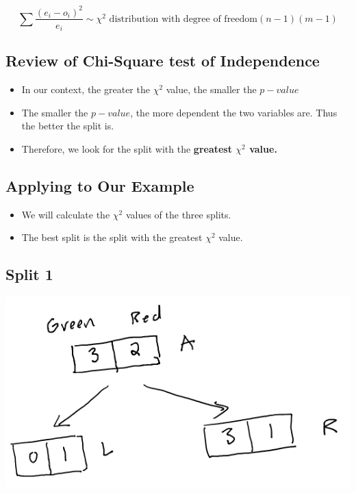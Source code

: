 \documentclass[
]{article}
\providecommand{\tightlist}{%
  \setlength{\itemsep}{0pt}\setlength{\parskip}{0pt}}
\begin{document}
\[\sum\frac{(e_i-o_i)^2}{e_i} \sim \chi^2 \text{ distribution with degree of freedom} (n-1)(m-1)\]

\hypertarget{review-of-chi-square-test-of-independence-1}{%
\subsection{Review of Chi-Square test of
Independence}\label{review-of-chi-square-test-of-independence-1}}

\begin{itemize}
\tightlist
\item
  In our context, the greater the \(\chi^2\) value, the smaller the
  \(p-value\)
\item
  The smaller the \(p-value\), the more dependent the two variables are.
  Thus the better the split is.
\item
  Therefore, we look for the split with the \textbf{greatest \(\chi^2\)
  value.}
\end{itemize}

\hypertarget{applying-to-our-example}{%
\subsection{Applying to Our Example}\label{applying-to-our-example}}

\begin{itemize}
\tightlist
\item
  We will calculate the \(\chi^2\) values of the three splits.\\
\item
  The best split is the split with the greatest \(\chi^2\) value.
\end{itemize}

\hypertarget{split-1}{%
\subsection{Split 1}\label{split-1}}

\includegraphics{images/im1.png}
\end{document}
